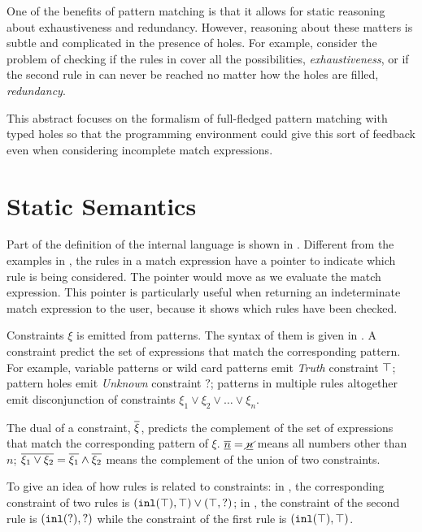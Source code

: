 \documentclass[acmsmall,screen,review,nonacm]{acmart}
\theoremstyle{slplain}
\numberwithin{thm}{section}
\begin{document}
One of the benefits of pattern matching is that it allows for static reasoning about exhaustiveness and redundancy.
However, reasoning about these matters is subtle and complicated in the presence of holes. 
For example, consider the problem of checking if the rules in  cover all the possibilities, \ie \emph{exhaustiveness}, or if the second rule in  can never be reached no matter how the holes are filled, \ie \emph{redundancy}. 

This abstract focuses on the formalism of full-fledged pattern matching with typed holes so that the programming environment could give this sort of feedback even when considering incomplete match expressions.

\section{Static Semantics}
\label{sec:statics}



Part of the definition of the internal language is shown in . 
Different from the examples in , the rules in a match expression have a pointer to indicate which rule is being considered. The pointer would move as we evaluate the match expression.
This pointer is particularly useful when returning an indeterminate match expression to the user, because it shows which rules have been checked.

Constraints $\xi$ is emitted from patterns. The syntax of them is given in . A constraint predict the set of expressions that match the corresponding pattern.
For example, variable patterns or wild card patterns emit \emph{Truth} constraint $\top$;
pattern holes emit \emph{Unknown} constraint $?$;
patterns in multiple rules altogether emit disconjunction of constraints $\xi_1 \vee \xi_2 \vee \dots \vee \xi_n$.

The dual of a constraint, $\overline{\xi}$, predicts the complement of the set of expressions that match the corresponding pattern of $\xi$.
\eg $\overline{\underline{n}}=\underline{\cancel{n}}$ means all numbers other than $n$;
$\overline{\xi_1 \vee \xi_2}=\overline{\xi_1} \wedge \overline{\xi_2}$ means the complement of the union of two constraints.

To give an idea of how rules is related to constraints:
in , the corresponding constraint of two rules is $(\mathtt{inl}(\top) , \top) \vee (\top , \mathtt{?})$;
in , the constraint of the second rule is $(\mathtt{inl}(\mathtt{?}) , \mathtt{?})$ while the constraint of the first rule is $(\mathtt{inl}(\top) , \top)$.
\end{document}
